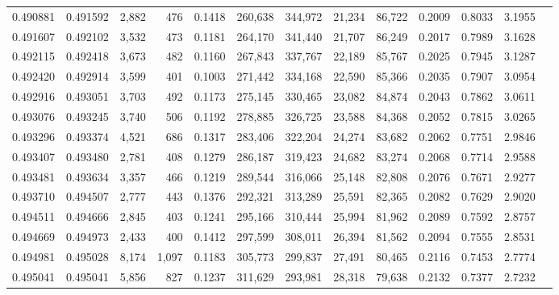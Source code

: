 \begin{tabular}{rrrrrrrrrrrrr}
0.490881 & 0.491592 &  2,882 &   476 &                                     0.1418 & 260,638 & 344,972 &  21,234 &  86,722 & 0.2009 & 0.8033 & 3.1955 \\
0.491607 & 0.492102 &  3,532 &   473 &                                     0.1181 & 264,170 & 341,440 &  21,707 &  86,249 & 0.2017 & 0.7989 & 3.1628 \\
0.492115 & 0.492418 &  3,673 &   482 &                                     0.1160 & 267,843 & 337,767 &  22,189 &  85,767 & 0.2025 & 0.7945 & 3.1287 \\
0.492420 & 0.492914 &  3,599 &   401 &                                     0.1003 & 271,442 & 334,168 &  22,590 &  85,366 & 0.2035 & 0.7907 & 3.0954 \\
0.492916 & 0.493051 &  3,703 &   492 &                                     0.1173 & 275,145 & 330,465 &  23,082 &  84,874 & 0.2043 & 0.7862 & 3.0611 \\
0.493076 & 0.493245 &  3,740 &   506 &                                     0.1192 & 278,885 & 326,725 &  23,588 &  84,368 & 0.2052 & 0.7815 & 3.0265 \\
0.493296 & 0.493374 &  4,521 &   686 &                                     0.1317 & 283,406 & 322,204 &  24,274 &  83,682 & 0.2062 & 0.7751 & 2.9846 \\
0.493407 & 0.493480 &  2,781 &   408 &                                     0.1279 & 286,187 & 319,423 &  24,682 &  83,274 & 0.2068 & 0.7714 & 2.9588 \\
0.493481 & 0.493634 &  3,357 &   466 &                                     0.1219 & 289,544 & 316,066 &  25,148 &  82,808 & 0.2076 & 0.7671 & 2.9277 \\
0.493710 & 0.494507 &  2,777 &   443 &                                     0.1376 & 292,321 & 313,289 &  25,591 &  82,365 & 0.2082 & 0.7629 & 2.9020 \\
0.494511 & 0.494666 &  2,845 &   403 &                                     0.1241 & 295,166 & 310,444 &  25,994 &  81,962 & 0.2089 & 0.7592 & 2.8757 \\
0.494669 & 0.494973 &  2,433 &   400 &                                     0.1412 & 297,599 & 308,011 &  26,394 &  81,562 & 0.2094 & 0.7555 & 2.8531 \\
0.494981 & 0.495028 &  8,174 & 1,097 &                                     0.1183 & 305,773 & 299,837 &  27,491 &  80,465 & 0.2116 & 0.7453 & 2.7774 \\
0.495041 & 0.495041 &  5,856 &   827 &                                     0.1237 & 311,629 & 293,981 &  28,318 &  79,638 & 0.2132 & 0.7377 & 2.7232 \\

\end{tabular}
